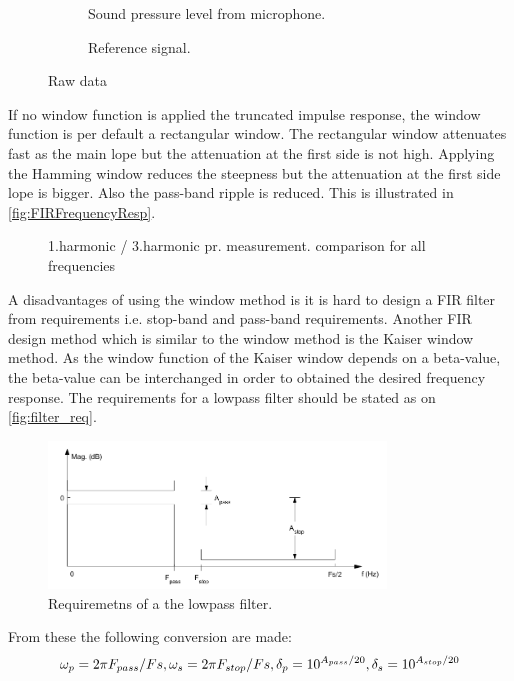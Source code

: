 \begin{figure}[H]
\centering
\begin{subfigure}[t]{0.45\textwidth}
    \centering
    
    \caption{Sound pressure level from microphone.}
    \label{fig:FIRTruncation}
\end{subfigure}
\begin{subfigure}[t]{0.45\textwidth}
    \centering
    
    \caption{Reference signal.}
    \label{fig:FIRHamming}
\end{subfigure}
\caption{Raw data}
\label{fig:FIRWindow}
\end{figure} 

If no window function is applied the truncated impulse response, the window function is per default a rectangular window. The rectangular window attenuates fast as the main lope but the attenuation at the first side is not high. Applying the Hamming window reduces the steepness but the attenuation at the first side lope is bigger. Also the pass-band ripple is reduced. This is illustrated in \autoref{fig:FIRFrequencyResp}.

\begin{figure}[H]
    \centering
    
    \caption{1.harmonic / 3.harmonic pr. measurement. comparison for all frequencies}
\label{fig:FIRFrequencyResp}
\end{figure}  

A disadvantages of using the window method is it is hard to design a FIR filter from requirements i.e. stop-band and pass-band requirements. Another FIR design method which is similar to the window method is the Kaiser window method. As the window function of the Kaiser window depends on a beta-value, the beta-value can be interchanged in order to obtained the desired frequency response. The requirements for a lowpass filter should be stated as on \autoref{fig:filter_req}.
\begin{figure}[H]
\centering
\includegraphics[width=0.8\textwidth]{figures/filter_req.png}
\caption{Requiremetns of a the lowpass filter.}
\label{fig:filter_req}
\end{figure}
From these the following conversion are made:
\begin{equation}
\omega_p=2\pi F_{pass}/Fs,\\
\omega_s=2\pi F_{stop}/Fs,\\
\delta_p=10^{A_{pass}/20},\\
\delta_s=10^{A_{stop}/20}
\end{equation}

